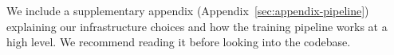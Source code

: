 We include a supplementary appendix (Appendix~\ref{sec:appendix-pipeline}) explaining our infrastructure choices and how the training pipeline works at a high level. We recommend reading it before looking into the codebase.

\tableofcontents
